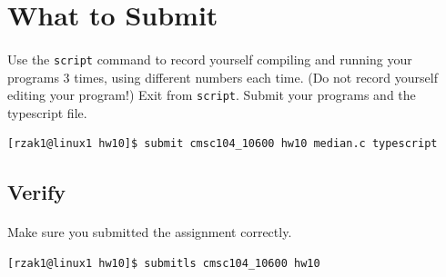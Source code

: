 \documentclass[letter,11pt]{article}
\begin{document}
\section*{What to Submit}
\paragraph{}Use the \texttt{script} command to record yourself compiling and running your programs 3 times, using different numbers each time. (Do not record yourself editing your program!) Exit from \texttt{script}. Submit your programs and the typescript file.

\begin{verbatim}
[rzak1@linux1 hw10]$ submit cmsc104_10600 hw10 median.c typescript
\end{verbatim}

\subsection*{Verify}
\paragraph{}Make sure you submitted the assignment correctly.
\begin{verbatim}
[rzak1@linux1 hw10]$ submitls cmsc104_10600 hw10
\end{verbatim}
\end{document}

